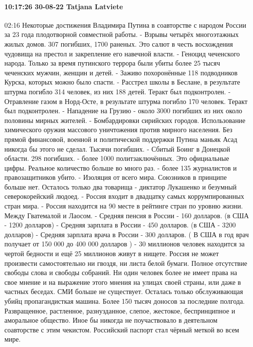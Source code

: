 \paragraph{10:17:26 30-08-22 Tatjana Latviete}
02:16
Некоторые достижения Владимира Путина в соавторстве с народом России за 23 года плодотворной совместной работы.
- Взрывы четырёх многоэтажных жилых домов. 307 погибших, 1700 раненых. Это салют в честь восхождения чудовища на престол и закрепление его навечной власти.
- Геноцид чеченского народа. Только за время путинского террора были убиты более 25 тысяч чеченских мужчин, женщин и детей.
- Заживо похоронённые 118 подводников Курска, которых можно было спасти.
- Расстрел школы в Беслане, в результате штурма погибло 314 человек, из них 188 детей. Теракт был подконтролен.
- Отравление газом в Норд-Осте, в результате штурма погибло 170 человек. Теракт был подконтролен.
- Нападение на Грузию - около 3000 погибших из них около половины мирных жителей.
- Бомбардировки сирийских городов. Использование химического оружия массового уничтожения против мирного населения. Без прямой финансовой, военной и политической поддержки Путина маньяк Асад никогда бы этого не сделал. Тысячи погибших.
- Сбитый Боинг в Донецкой области. 298 погибших.
- более 1000 политзаключённых. Это официальные цифры. Реальное количество больше во много раз.
- более 135 журналистов и правозащитников убито.
- Изоляция от всего мира. Союзников в принципе больше нет. Осталось только два товарища - диктатор Лукашенко и безумный северокорейский людоед.
- Россия входит в двадцатку самых коррумпированных стран мира.
- Россия находится на 90 месте в рейтинге стран по уровню жизни. Между Гватемалой и Лаосом.
- Средняя пенсия в России - 160 долларов. (в США - 1200 долларов)
- Средняя зарплата в России - 450 долларов. (в США - 3200 долларов)
- Средняя зарплата врача в России - 300 долларов. ( В США в год врач получает от 150 000 до 400 000 долларов )
- 30 миллионов человек находится за чертой бедности и ещё 25 миллионов живут в нищете.
Россия не может произвести самостоятельно ни гвоздя, ни листа белой бумаги.
Полное отсутствие свободы слова и свободы собраний. Ни один человек более не имеет права на свое мнение и на выражение этого мнения на улицах своей страны, или даже в частных беседах.
СМИ больше не существует. Осталась только обслуживающая убийц пропагандисткая машина.
Более 150 тысяч доносов за последние полгода.
Развращенное, растленное, разнузданное, слепое, жестокое, беспринципное и аморальное общество. Иное бы никогда не поучаствовало в деятельном соавторстве с этим чекистом.
Российский паспорт стал чёрный меткой во всем мире.
